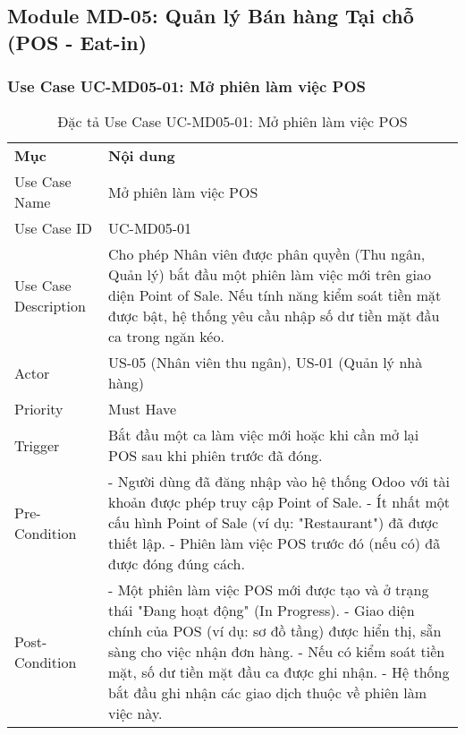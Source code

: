 \subsection{Module MD-05: Quản lý Bán hàng Tại chỗ (POS - Eat-in)}

\subsubsection{Use Case UC-MD05-01: Mở phiên làm việc POS}

\begin{longtable}{|m{4cm}|p{11cm}|}
\caption{Đặc tả Use Case UC-MD05-01: Mở phiên làm việc POS} \label{tab:uc_md05_01} \\
\hline

\endhead %
\hline
\endfoot %
\hline
\endlastfoot %
\multicolumn{2}{|c|}{\textbf{2.1. Tóm tắt (Summary)}} \\
\hline
\textbf{Mục} & \textbf{Nội dung} \\
\hline
Use Case Name & Mở phiên làm việc POS \\
\hline
Use Case ID & UC-MD05-01 \\
\hline
Use Case Description & Cho phép Nhân viên được phân quyền (Thu ngân, Quản lý) bắt đầu một phiên làm việc mới trên giao diện Point of Sale. Nếu tính năng kiểm soát tiền mặt được bật, hệ thống yêu cầu nhập số dư tiền mặt đầu ca trong ngăn kéo. \\
\hline
Actor & US-05 (Nhân viên thu ngân), US-01 (Quản lý nhà hàng) \\
\hline
Priority & Must Have \\
\hline
Trigger & Bắt đầu một ca làm việc mới hoặc khi cần mở lại POS sau khi phiên trước đã đóng. \\
\hline
Pre-Condition & - Người dùng đã đăng nhập vào hệ thống Odoo với tài khoản được phép truy cập Point of Sale. \newline - Ít nhất một cấu hình Point of Sale (ví dụ: "Restaurant") đã được thiết lập. \newline - Phiên làm việc POS trước đó (nếu có) đã được đóng đúng cách. \\
\hline
Post-Condition & - Một phiên làm việc POS mới được tạo và ở trạng thái "Đang hoạt động" (In Progress). \newline - Giao diện chính của POS (ví dụ: sơ đồ tầng) được hiển thị, sẵn sàng cho việc nhận đơn hàng. \newline - Nếu có kiểm soát tiền mặt, số dư tiền mặt đầu ca được ghi nhận. \newline - Hệ thống bắt đầu ghi nhận các giao dịch thuộc về phiên làm việc này. \\

\end{longtable}
